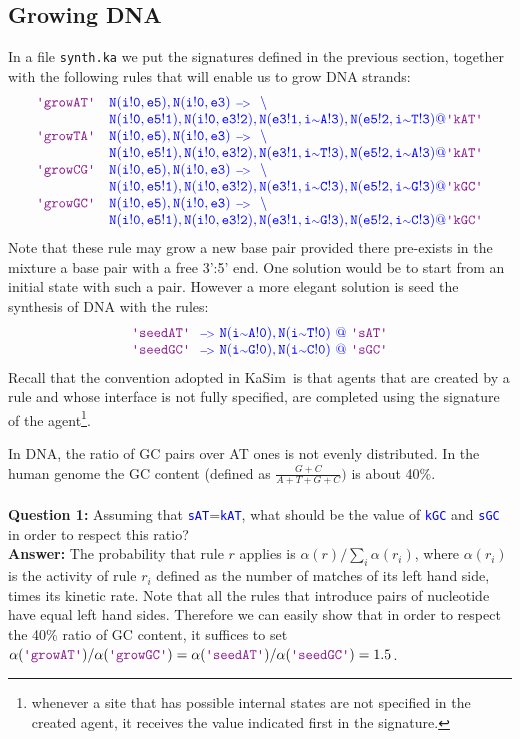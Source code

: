 \documentclass[11pt]{article}
\makeatletter
\def\al{\alpha}
\def\ks{{\sc KaSim}}
\def\ttt#1{\texttt{\textcolor{blue}{#1}}}
\def\mtt#1{{\tt{\color{blue} #1}}}
\def\lab#1{\hbox{\ttt{\color{Plum}\textquotesingle #1\textquotesingle}}}
\def\int{{\scriptstyle\sim}}
\def\Krule#1#2#3{\color{blue}\mtt{{\color{blue}\lab{#1}\ #2\ @\ #3}}}
\def\Kar{\ {\scriptstyle\tt-\! >}\ }
\makeatother
\begin{document}
\subsection{Growing DNA}
In a file \texttt{synth.ka} we put the signatures defined in the previous section, together with the following rules that will enable us to grow DNA strands:
$$
\color{blue}
\begin{array}{ll}
\tt\lab{growAT}& \tt N(i!0,e5),N(i!0,e3)\Kar\ \backslash\\ 
& \tt N(i!0,e5!1),N(i!0,e3!2),N(e3!1,i\int A!3),N(e5!2,i\int T!3)@\lab{kAT}\\
\tt\lab{growTA}& \tt N(i!0,e5),N(i!0,e3)\Kar\ \backslash\\ 
& \tt N(i!0,e5!1),N(i!0,e3!2),N(e3!1,i\int T!3),N(e5!2,i\int A!3)@\lab{kAT}\\
\tt\lab{growCG}& \tt N(i!0,e5),N(i!0,e3)\Kar\ \backslash \\ 
& \tt N(i!0,e5!1),N(i!0,e3!2),N(e3!1,i\int C!3),N(e5!2,i\int G!3)@\lab{kGC}\\
\tt\lab{growGC}& \tt N(i!0,e5),N(i!0,e3)\Kar\ \backslash \\ 
& \tt N(i!0,e5!1),N(i!0,e3!2),N(e3!1,i\int G!3),N(e5!2,i\int C!3)@\lab{kGC}
\end{array}
$$
Note that these rule may grow a new base pair provided there pre-exists in the mixture a base pair with a free 3':5' end. One solution would be to start from an initial state with such a pair. However a more elegant solution is seed the synthesis of DNA with the rules:
$$
\begin{array}{l}
\Krule{seedAT}{\Kar N(i\int A!0),N(i\int T!0)}{\lab{sAT}}\\
\Krule{seedGC}{\Kar N(i\int G!0),N(i\int C!0)}{\lab{sGC}}
\end{array}
$$
Recall that the convention adopted in \ks~is that agents that are created by a rule and whose interface is not fully specified, are completed using the signature of the agent\footnote{whenever a site that has possible internal states are not specified in the created agent, it receives the value indicated first in the signature.}.

In DNA, the ratio of GC pairs over AT ones is not evenly distributed. In the human genome the GC content (defined as $\frac{G+C}{A+T+G+C})$ is about 40\%. 
\\\\ \textbf{Question 1:}
Assuming that \lab{sAT}=\lab{kAT}, what should be the value of \lab{kGC} and \lab{sGC} in order to respect this ratio?
\\ \textbf{Answer:} The probability that rule $r$ applies is $\alpha(r)/\sum_i\alpha(r_i)$, where $\al(r_i)$ is the activity of rule $r_i$ defined as the number of matches of its left hand side, times its kinetic rate. Note that all the rules that introduce pairs of nucleotide have equal left hand sides. Therefore we can easily show that in order to respect the 40\% ratio of GC content, it suffices to set $\al(\lab{growAT})/\al(\lab{growGC})=\al(\lab{seedAT})/\al(\lab{seedGC})=1.5$. 
\end{document}
